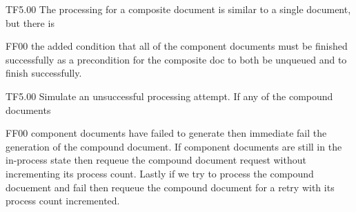 %
%
%
%
%
%
%
%
\@pvspace{8.0pt}%
\begin{lcom}{2.5}%
\begin{cpar}{0}{T}{F}{5.0}{0}{}%
 The processing for a composite document is similar to a single document, but
 there is
\end{cpar}%
\begin{cpar}{1}{F}{F}{0}{0}{}%
 the added condition that all of the component documents must be finished
 successfully
 as a precondition for the composite doc to both be unqueued and to finish
 successfully.
\end{cpar}%
\end{lcom}%
%
%
%
%
%
%
%
%
%
\@pvspace{8.0pt}%
\@x{}%
%
\@xx{}%
%
%
%
%
%
%
\@pvspace{8.0pt}%
\begin{lcom}{2.5}%
\begin{cpar}{0}{T}{F}{5.0}{0}{}%
Simulate an unsuccessful processing attempt. If any of the compound documents
\end{cpar}%
\begin{cpar}{1}{F}{F}{0}{0}{}%
 component documents have failed to generate then immediate fail the
 generation of the
 compound document. If component documents are still in the in-process state
 then requeue
 the compound document request without incrementing its process count. Lastly
 if we try
 to process the compound docuement and fail then requeue the compound
 document for a retry
 with its process count incremented.
\end{cpar}%
\end{lcom}%
